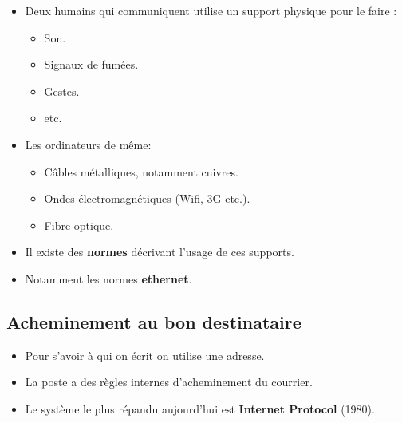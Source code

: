 \begin{slide}
	\begin{itemize}
		\item Deux humains qui communiquent utilise un support physique pour le faire :
 			\begin{itemize}
				\item Son. 
				\item Signaux de fumées.
				\item Gestes.
				\item etc.
			\end{itemize}
		\item Les ordinateurs de même:
			\begin{itemize}
				\item Câbles métalliques, notamment cuivres.
				\item Ondes électromagnétiques (Wifi, 3G etc.).
				\item Fibre optique. %
			\end{itemize} 
		\item Il existe des \textbf{normes} décrivant l'usage de ces supports.
		\item Notamment les normes \textbf{ethernet}.
	\end{itemize}
\end{slide}


\subsection{Acheminement au bon destinataire}

\begin{slide}
	\begin{itemize}
		\item Pour s'avoir à qui on écrit on utilise une adresse.
		\item La poste a des règles internes d'acheminement du courrier.
		\item Le système le plus répandu aujourd'hui est \textbf{Internet Protocol} (1980).
	\end{itemize}
\end{slide}


